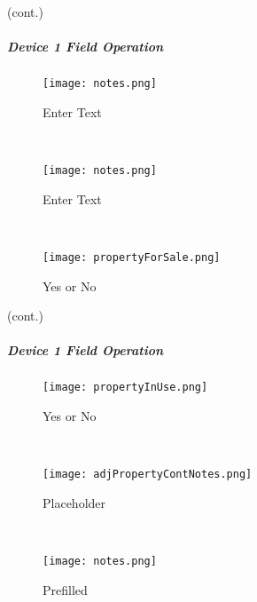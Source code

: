 (cont.)
\vspace{1.5in}

\vspace{1.5in}

\vspace{2.5in}

\clearpage
\subparagraph*{Device 1 Field Operation}
\begin{wrapfigure}{r}{0.4\textwidth}
\centering
    \texttt{[image: notes.png]}
\caption {Enter Text}
\vspace{.1in}

\HRule \\[.4cm] %
\vspace{.1in}

    \texttt{[image: notes.png]}
\caption{Enter Text}
\vspace{.1in}

\HRule \\[.4cm] %
\vspace{.1in}

    \texttt{[image: propertyForSale.png]}
\caption{Yes or No}
\end{wrapfigure}

(cont.)
\vspace{.75in}

\vspace{2.5in}

\vspace{2.6in}

\clearpage
\subparagraph*{Device 1 Field Operation}
\begin{wrapfigure}{r}{0.4\textwidth}
\centering
    \texttt{[image: propertyInUse.png]}
\caption {Yes or No}
\vspace{.1in}

\HRule \\[.4cm] %
\vspace{.1in}

    \texttt{[image: adjPropertyContNotes.png]}
\caption{Placeholder}
\vspace{.1in}

\HRule \\[.4cm] %
\vspace{.1in}

    \texttt{[image: notes.png]}
\caption{Prefilled}
\end{wrapfigure}

